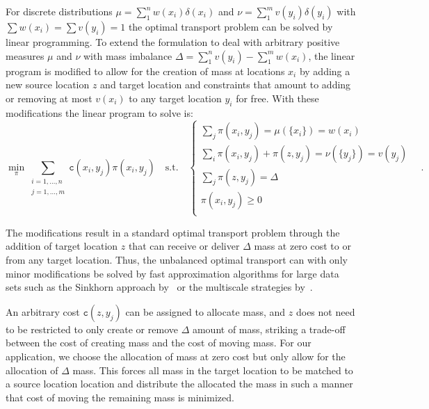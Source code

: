\documentclass{llncs}
\newcommand{\cost}[0]{\mathtt{c}}
\newcommand{\coupling}[0]{\pi}
\begin{document}
For discrete distributions $\mu = \sum_1^n w(x_i) \delta(x_i)$ and $ \nu =
\sum_1^m v(y_i) \delta(y_i)$ with $\sum w(x_i) = \sum v(y_i) = 1$ the optimal
transport problem can be solved by linear programming. To extend the
formulation to deal with arbitrary positive measures $\mu$ and $\nu$ with mass
imbalance  $\Delta = \sum_1^n v(y_i)  - \sum_1^m w(x_i)$, the linear program is
modified to allow for the creation of mass at locations $x_i$ by adding a new
source location $z$ and target location and constraints that amount to adding
or removing at most $v(x_i)$ to any target location $y_i$ for free. With these
modifications the linear program to solve is: 
\begin{equation}
\min_\coupling \sum_{\substack{i=1,\dots,n\\ j=1,\dots,m}} 
      \cost(x_i, y_j) \coupling(x_i, y_j) \quad \text{s.t.}\quad 
\begin{cases}
  \sum_j \coupling(x_i, y_j)  = \mu(\{x_i\}) = w(x_i) & \\ 
  \sum_i \coupling(x_i, y_j) + \coupling(z, y_j)= \nu(\{y_j\}) = v(y_j) & \\
  \sum_j \coupling(z, y_j)  = \Delta \\
  \coupling(x_i, y_j) \ge 0 \\
\end{cases}\,.
\label{eq:unbalanced}
\end{equation} 

The modifications result in a standard optimal transport problem through the
addition of target location $z$ that can receive or deliver $\Delta$ mass at
zero cost to or from any target location.  Thus, the unbalanced optimal
transport can with only minor modifications be solved by fast approximation
algorithms for large data sets such as the Sinkhorn approach
by~\cite{cuturi2013sinkhorn} or the multiscale strategies
by~\citet{gerber2017multiscale}. 

An arbitrary cost $\cost(z, y_j)$ can be assigned to allocate mass, and $z$
does not need to be restricted to only create or remove $\Delta$ amount of
mass, striking a trade-off between the cost of creating mass and the cost of
moving mass. For our application, we choose the allocation of mass at zero cost
but only allow for the allocation of $\Delta$ mass. This forces all mass in the
target location to be matched to a source location location and distribute the
allocated the mass in such a manner that cost of moving the remaining mass is
minimized.
\end{document}
